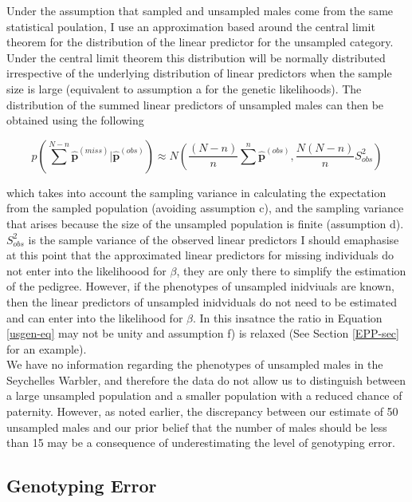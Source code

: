 \documentclass{article}
\begin{document}
 Under the assumption that sampled and unsampled males come from the same statistical poulation,  I use an approximation based around the central limit theorem for the distribution of the linear predictor for the unsampled category.  Under the central limit theorem this distribution will be normally distributed irrespective of the underlying distribution of linear predictors when the sample size is large (equivalent to assumption a for the genetic likelihoods).  The distribution of the summed linear predictors of unsampled males can then be obtained using the following

\begin{equation}
p(\sum^{N-n}{\bm{\hat{p}}^{(miss)}} | \bm{\hat{p}}^{(obs)}) \approx N(\frac{(N-n)}{n}\sum^{n}\bm{\hat{p}}^{(obs)}, \frac{N(N-n)}{n}S_{obs}^{2})
\end{equation}

which takes into account the sampling variance in calculating the expectation from the sampled population (avoiding assumption c), and the sampling variance that arises because the size of the unsampled population is finite (assumption d). $S_{obs}^{2}$ is the sample variance of the observed linear predictors \citep[see][Chapter 7]{Gelman.2004}   I should emaphasise at this point that the approximated linear predictors for missing individuals do not enter into the likelihoood for $\beta$, they are only there to simplify the estimation of the pedigree.  However, if the phenotypes of unsampled inidviuals are known, then the linear predictors of unsampled inidviduals do not need to be estimated and can enter into the likelihood for $\beta$.  In  this insatnce the ratio in Equation \ref{usgen-eq} may not be unity and assumption f) is relaxed (See Section \ref{EPP-sec} for an example).\\

We have no information regarding the phenotypes of unsampled males in the Seychelles Warbler, and therefore the data do not allow us to distinguish between a large unsampled population and a smaller population with a reduced chance of paternity.  However, as noted earlier, the discrepancy between our estimate of 50 unsampled males and our prior belief that the number of males should be less than 15 may be a consequence of underestimating the level of genotyping error.

\subsection{Genotyping Error}
\label{GE-sec}
\end{document}
